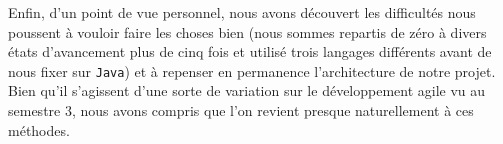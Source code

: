 \documentclass[11pt,a4paper, openany]{book}
\begin{document}
Enfin, d'un point de vue personnel, nous avons découvert les difficultés nous poussent à vouloir faire les choses bien (nous sommes repartis de zéro à divers états d'avancement plus de cinq fois et utilisé trois langages différents avant de nous fixer sur \texttt{Java}) et à repenser en permanence l'architecture de notre projet. Bien qu'il s'agissent d'une sorte de variation sur le développement agile vu au semestre 3, nous avons compris que l'on revient presque naturellement à ces méthodes.


\newpage
\thispagestyle{empty}

\vspace*{\fill}
\begingroup
\begin{center}
\LaTeXe
\end{center}

\endgroup
\vspace*{\fill}
\end{document}
